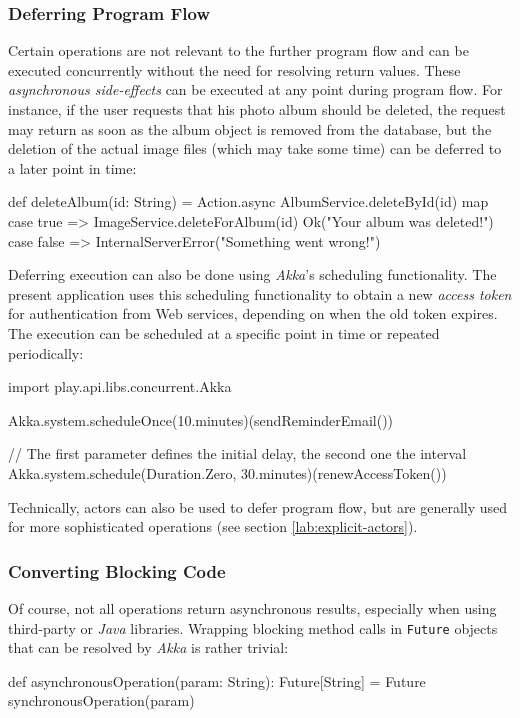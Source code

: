\subsubsection*{Deferring Program Flow}
Certain operations are not relevant to the further program flow and can be executed concurrently without the need for resolving return values. These \textit{asynchronous side-effects} can be executed at any point during program flow. For instance, if the user requests that his photo album should be deleted, the request may return as soon as the album object is removed from the database, but the deletion of the actual image files (which may take some time) can be deferred to a later point in time:

\begin{JavaCode}
def deleteAlbum(id: String) = Action.async {
    AlbumService.deleteById(id) map {
        case true =>
            ImageService.deleteForAlbum(id)
            Ok("Your album was deleted!")
        case false =>
            InternalServerError("Something went wrong!")
    }
}
 
\end{JavaCode}

Deferring execution can also be done using \textit{Akka}'s scheduling functionality. The present application uses this scheduling functionality to obtain a new \textit{access token} for authentication from Web services, depending on when the old token expires. The execution can be scheduled at a specific point in time or repeated periodically:
\begin{JavaCode}
import play.api.libs.concurrent.Akka

Akka.system.scheduleOnce(10.minutes)(sendReminderEmail())

// The first parameter defines the initial delay, the second one the interval
Akka.system.schedule(Duration.Zero, 30.minutes)(renewAccessToken())

\end{JavaCode}

Technically, actors can also be used to defer program flow, but are generally used for more sophisticated operations (see section \ref{lab:explicit-actors}).

\subsubsection*{Converting Blocking Code}
Of course, not all operations return asynchronous results, especially when using third-party or \textit{Java} libraries. Wrapping blocking method calls in \texttt{Future} objects that can be resolved by \textit{Akka} is rather trivial:
\begin{JavaCode}
def asynchronousOperation(param: String): Future[String] = {
    Future {
        synchronousOperation(param)
    }
}
\end{JavaCode}

